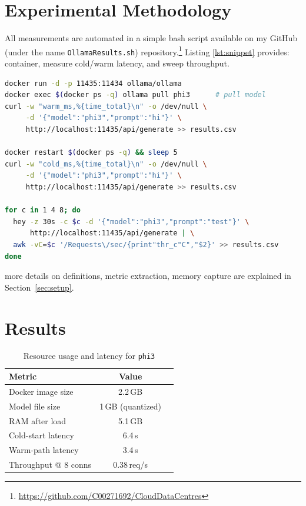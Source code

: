 \documentclass[conference]{IEEEtran}
\begin{document}
\section{Experimental Methodology}\label{sec:method}

All measurements are automated in a simple bash script available on my GitHub (under the name \texttt{OllamaResults.sh})
repository.\footnote{\url{https://github.com/C00271692/CloudDataCentres}}  
Listing \ref{lst:snippet} provides:
container, measure cold/warm latency, and sweep throughput.

\begin{lstlisting}[language=bash,basicstyle=\footnotesize\ttfamily,
                   caption={Key excerpt of \texttt{OllamaResults.sh}},
                   label={lst:snippet}]
docker run -d -p 11435:11434 ollama/ollama
docker exec $(docker ps -q) ollama pull phi3      # pull model
curl -w "warm_ms,%{time_total}\n" -o /dev/null \
     -d '{"model":"phi3","prompt":"hi"}' \
     http://localhost:11435/api/generate >> results.csv

docker restart $(docker ps -q) && sleep 5
curl -w "cold_ms,%{time_total}\n" -o /dev/null \
     -d '{"model":"phi3","prompt":"hi"}' \
     http://localhost:11435/api/generate >> results.csv

for c in 1 4 8; do
  hey -z 30s -c $c -d '{"model":"phi3","prompt":"test"}' \
      http://localhost:11435/api/generate | \
  awk -vC=$c '/Requests\/sec/{print"thr_c"C","$2}' >> results.csv
done
\end{lstlisting}

more details on definitions, metric extraction, memory capture are
explained in Section~\ref{sec:setup}.

\section{Results}\label{sec:results}
\begin{table}[t]
  \caption{Resource usage and latency for \texttt{phi3}}
  \label{tab:metrics}
  \centering
  \begin{tabular}{lcc}
    \toprule
    \textbf{Metric} & \textbf{Value} \\
    \midrule
    Docker image size   & 2.2\,GB \\
    Model file size     & 1\,GB (quantized) \\
    RAM after load      & 5.1\,GB \\
    Cold-start latency  & 6.4\,s \\
    Warm-path latency   & 3.4\,s \\
    Throughput @ 8 conns & 0.38\,req/s \\

    \bottomrule
  \end{tabular}
\end{table}
\end{document}
